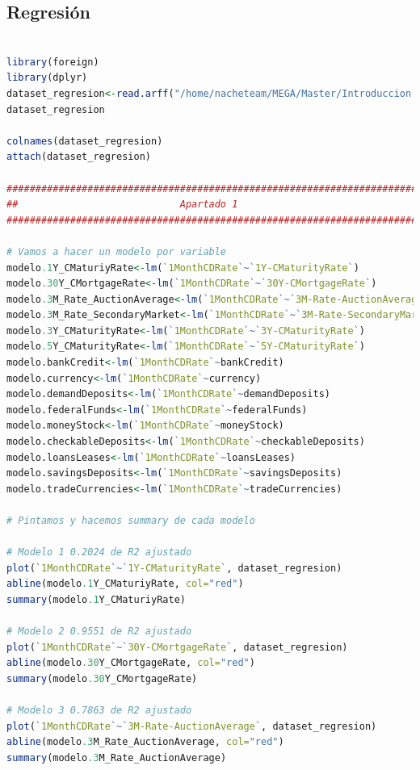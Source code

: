 \documentclass[12pt,a4paper]{article}
\begin{document}
\subsection{Regresión}

\begin{lstlisting}[basicstyle=\tiny, language=R]

library(foreign)
library(dplyr)
dataset_regresion<-read.arff("/home/nacheteam/MEGA/Master/Introduccion a la ciencia de datos/Trabajo Integrador/DATOS/Datasets Regresion/treasury/treasury.dat")
dataset_regresion

colnames(dataset_regresion)
attach(dataset_regresion)

###########################################################################
##                            Apartado 1                                 ##
###########################################################################

# Vamos a hacer un modelo por variable
modelo.1Y_CMaturiyRate<-lm(`1MonthCDRate`~`1Y-CMaturityRate`)
modelo.30Y_CMortgageRate<-lm(`1MonthCDRate`~`30Y-CMortgageRate`)
modelo.3M_Rate_AuctionAverage<-lm(`1MonthCDRate`~`3M-Rate-AuctionAverage`)
modelo.3M_Rate_SecondaryMarket<-lm(`1MonthCDRate`~`3M-Rate-SecondaryMarket`)
modelo.3Y_CMaturityRate<-lm(`1MonthCDRate`~`3Y-CMaturityRate`)
modelo.5Y_CMaturityRate<-lm(`1MonthCDRate`~`5Y-CMaturityRate`)
modelo.bankCredit<-lm(`1MonthCDRate`~bankCredit)
modelo.currency<-lm(`1MonthCDRate`~currency)
modelo.demandDeposits<-lm(`1MonthCDRate`~demandDeposits)
modelo.federalFunds<-lm(`1MonthCDRate`~federalFunds)
modelo.moneyStock<-lm(`1MonthCDRate`~moneyStock)
modelo.checkableDeposits<-lm(`1MonthCDRate`~checkableDeposits)
modelo.loansLeases<-lm(`1MonthCDRate`~loansLeases)
modelo.savingsDeposits<-lm(`1MonthCDRate`~savingsDeposits)
modelo.tradeCurrencies<-lm(`1MonthCDRate`~tradeCurrencies)

# Pintamos y hacemos summary de cada modelo

# Modelo 1 0.2024 de R2 ajustado
plot(`1MonthCDRate`~`1Y-CMaturityRate`, dataset_regresion)
abline(modelo.1Y_CMaturiyRate, col="red")
summary(modelo.1Y_CMaturiyRate)

# Modelo 2 0.9551 de R2 ajustado
plot(`1MonthCDRate`~`30Y-CMortgageRate`, dataset_regresion)
abline(modelo.30Y_CMortgageRate, col="red")
summary(modelo.30Y_CMortgageRate)

# Modelo 3 0.7863 de R2 ajustado
plot(`1MonthCDRate`~`3M-Rate-AuctionAverage`, dataset_regresion)
abline(modelo.3M_Rate_AuctionAverage, col="red")
summary(modelo.3M_Rate_AuctionAverage)


\end{lstlisting}
\end{document}
